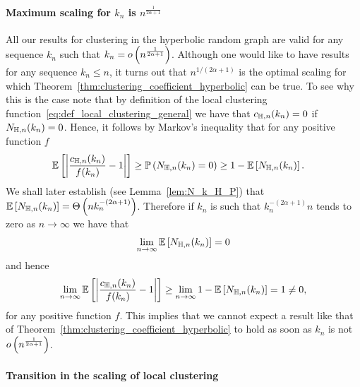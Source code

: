 \paragraph{Maximum scaling for $k_n$ is $n^{\frac{1}{2\alpha +1}}$}
All our results for clustering in the hyperbolic random graph are valid for any sequence $k_n$ such that $k_n = o\left(n^{\frac{1}{2\alpha + 1}}\right)$. Although one would like to have results for any sequence $k_n \le n$, it turns out that $n^{1/(2\alpha + 1)}$ is the optimal scaling for which Theorem~\ref{thm:clustering_coefficient_hyperbolic} can be true. To see why this is the case note that by definition of the local clustering function~\eqref{eq:def_local_clustering_general} we have that $c_{\mathbb{H},n}(k_n) = 0$ if $N_{\mathbb{H},n}(k_n) = 0$. Hence, it follows by Markov's inequality that for any positive function $f$
\begin{align*}
	\mathbb{E}\left[\left|\frac{c_{\mathbb{H},n}(k_n)}{f(k_n)} - 1\right|\right] 
	&\ge \mathbb{P}\left(N_{\mathbb{H},n}(k_n) = 0\right) \ge 1 - \mathbb{E}\left[N_{\mathbb{H},n}(k_n)\right].
\end{align*}
We shall later establish (see Lemma~\ref{lem:N_k_H_P}) that $\mathbb{E}\left[N_{\mathbb{H},n}(k_n)\right] = \Theta\left(n k_n^{-(2\alpha + 1)}\right)$. Therefore if $k_n$ is such that $k_n^{-(2\alpha + 1)} n$ tends to zero as $n \to \infty$ we have that 
\[
	\lim_{n \to \infty} \mathbb{E}\left[N_{\mathbb{H},n}(k_n)\right] = 0
\]
and hence
\[
	\lim_{n \to \infty} \mathbb{E}\left[\left|\frac{c_{\mathbb{H},n}(k_n)}{f(k_n)} - 1\right|\right] 
	\ge \lim_{n \to \infty} 1 - \mathbb{E}\left[N_{\mathbb{H},n}(k_n)\right] = 1 \ne 0,
\]
for any positive function $f$. This implies that we cannot expect a result like that of Theorem~\ref{thm:clustering_coefficient_hyperbolic} to hold as soon as $k_n$ is not $o\left(n^{\frac{1}{2\alpha + 1}}\right)$.

\paragraph{Transition in the scaling of local clustering}




